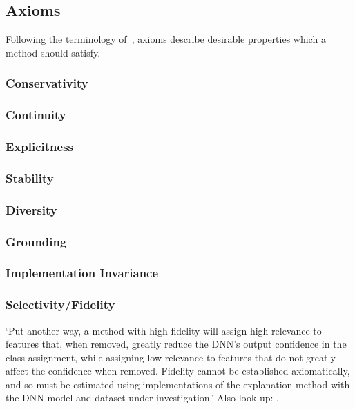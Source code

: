 \subsection{Axioms}
Following the terminology of~\cite{Sundararajan.2017}, axioms describe desirable properties which a method should satisfy.
\subsubsection{Conservativity}
\subsubsection{Continuity}
\subsubsection{Explicitness}
\citeauthor{AlvarezMelis.2018}
\subsubsection{Stability}
\citeauthor{AlvarezMelis.2018}
\subsubsection{Diversity}
\citeauthor{AlvarezMelis.2018}
\subsubsection{Grounding}
\citeauthor{AlvarezMelis.2018}
\subsubsection{Implementation Invariance}
\subsubsection{Selectivity/Fidelity}
`Put another way, a method with high fidelity will assign high relevance to features that, when removed, greatly reduce the DNN’s output confidence in the class assignment, while assigning low relevance to features that do not greatly affect the confidence when removed. Fidelity cannot be established axiomatically, and so must be estimated using implementations of the explanation method with the DNN model and dataset under investigation.'\cite{Tomsett.2019} Also look up: \citeauthor{Bach.2015, AlvarezMelis.2018}.

